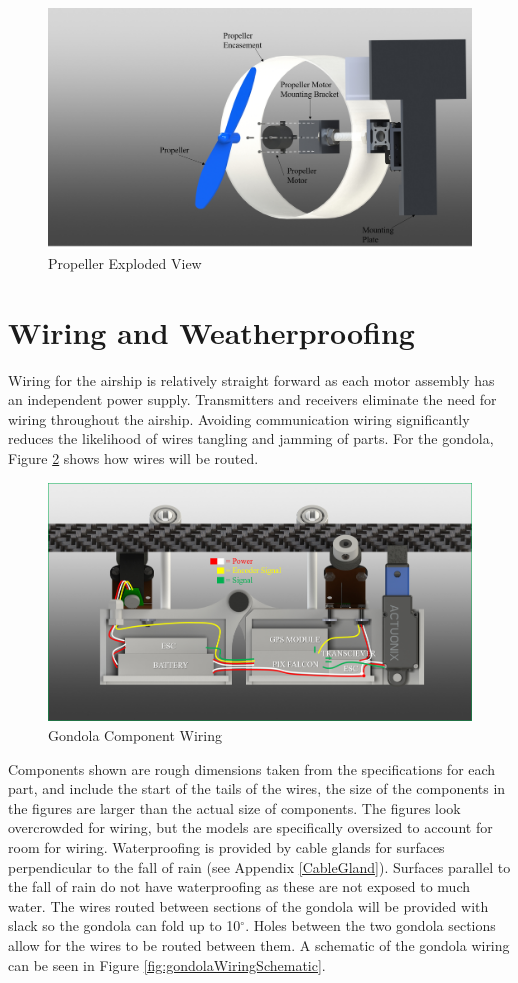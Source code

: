 \documentclass[../main.tex]{subfiles}
\begin{document}
\begin{figure}[H]
	\centering
	\includegraphics[width=.8\linewidth]{img/design/thruster/propAssembly.png}
	\caption{Propeller Exploded View}
	\label{fig:propAssembly}
\end{figure}

\section{Wiring and Weatherproofing}
Wiring for the airship is relatively straight forward as each motor assembly has an  independent power supply. Transmitters and receivers eliminate the need for wiring throughout the airship. Avoiding communication wiring significantly reduces the likelihood of wires tangling and jamming of parts. For the gondola, Figure \ref{fig:gondolaWiring} shows how wires will be routed. 

\begin{figure}[H]
	\centering
	\includegraphics[width=.8\linewidth]{img/design/gondola/gondolaWiring.png}
	\caption{Gondola Component Wiring}
	\label{fig:gondolaWiring}
\end{figure}

Components shown are rough dimensions taken from the specifications for each part, and include the start of the tails of the wires, the size of the components in the figures are larger than the actual size of components. The figures look overcrowded for wiring, but the models are specifically oversized to account for room for wiring. Waterproofing is provided by cable glands for surfaces perpendicular to the fall of rain (see Appendix \ref{CableGland}). Surfaces parallel to the fall of rain do not have waterproofing as these are not exposed to much water. The wires routed between sections of the gondola will be provided with slack so the gondola can fold up to 10$^{\circ}$. Holes between the two gondola sections allow for the wires to be routed between them. A schematic of the gondola wiring can be seen in Figure \ref{fig:gondolaWiringSchematic}.
\end{document}
